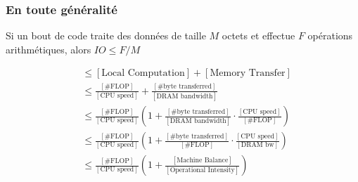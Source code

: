 \documentclass[xcolor={x11names,svgnames}]{beamer}
\begin{document}
\begin{frame}
  \frametitle{En toute généralité}

  \begin{theorem}
    Si un bout de code traite des données de taille $M$ octets et effectue $F$ opérations
    arithmétiques, alors $IO \leq F / M$
  \end{theorem}

  \begin{align*}
    [\text{Time}]  &\leq [\text{Local Computation}] + [\text{Memory Transfer}] \\
                   &\leq \frac{[\text{\#FLOP}]}{[\text{CPU speed}]} + \frac{[\text{\# byte transferred}]}{[\text{DRAM bandwidth}]} \\
                   &\leq \frac{[\text{\#FLOP}]}{[\text{CPU speed}]} \left( 1 + \frac{[\text{\# byte transferred}]}{[\text{DRAM bandwidth}]} \cdot \frac{[\text{CPU speed}]}{[\text{\#FLOP}]} \right) \\
                   &\leq \frac{[\text{\#FLOP}]}{[\text{CPU speed}]} \left( 1 + \frac{[\text{\# byte transferred}]}{[\text{\#FLOP}]} \cdot \frac{[\text{CPU speed}]}{[\text{DRAM bw}]}  \right) \\
                   &\leq \frac{[\text{\#FLOP}]}{[\text{CPU speed}]} \left( 1 + \frac{[\text{Machine Balance}]}{[\text{Operational Intensity}]} \right) \\
  \end{align*}
\end{frame}  

\end{document}
